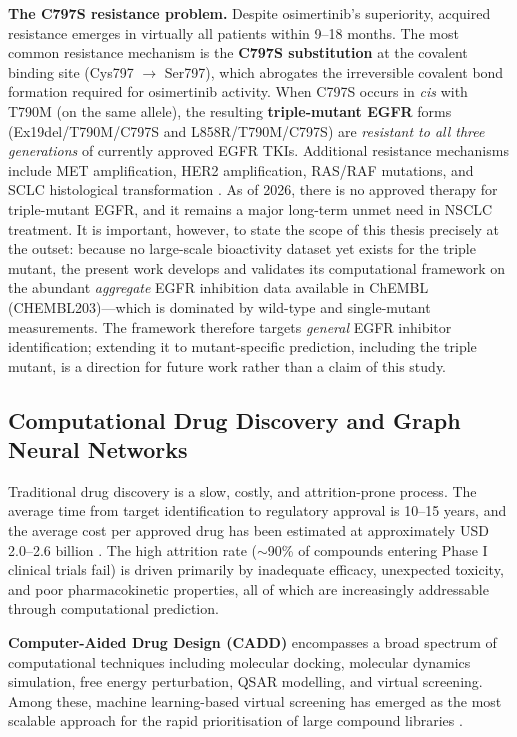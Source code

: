 \textbf{The C797S resistance problem.} Despite osimertinib's superiority, acquired
resistance emerges in virtually all patients within 9--18 months. The most common
resistance mechanism is the \textbf{C797S substitution} at the covalent binding
site (Cys797 $\to$ Ser797), which abrogates the irreversible covalent bond
formation required for osimertinib activity. When C797S occurs in \textit{cis}
with T790M (on the same allele), the resulting \textbf{triple-mutant EGFR} forms
(Ex19del/T790M/C797S and L858R/T790M/C797S) are \textit{resistant to all three
generations} of currently approved EGFR TKIs. Additional resistance mechanisms
include MET amplification, HER2 amplification, RAS/RAF mutations, and SCLC
histological transformation \parencite{leonetti2019resistance}. As of 2026, there
is no approved therapy for triple-mutant EGFR, and it remains a major long-term unmet
need in NSCLC treatment. It is important, however, to state the scope of this thesis
precisely at the outset: because no large-scale bioactivity dataset yet exists for the
triple mutant, the present work develops and validates its computational framework on
the abundant \emph{aggregate} EGFR inhibition data available in ChEMBL
(CHEMBL203)---which is dominated by wild-type and single-mutant measurements. The
framework therefore targets \emph{general} EGFR inhibitor identification; extending it
to mutant-specific prediction, including the triple mutant, is a direction for future
work rather than a claim of this study.

\subsection{Computational Drug Discovery and Graph Neural Networks}

Traditional drug discovery is a slow, costly, and attrition-prone process.
The average time from target identification to regulatory approval is 10--15 years,
and the average cost per approved drug has been estimated at approximately USD
2.0--2.6 billion \parencite{schneider2020rethinking}. The high attrition rate
($\sim$90\% of compounds entering Phase I clinical trials fail) is driven primarily
by inadequate efficacy, unexpected toxicity, and poor pharmacokinetic properties,
all of which are increasingly addressable through computational prediction.

\textbf{Computer-Aided Drug Design (CADD)} encompasses a broad spectrum of
computational techniques including molecular docking, molecular dynamics simulation,
free energy perturbation, QSAR modelling, and virtual screening. Among these,
machine learning-based virtual screening has emerged as the most scalable approach
for the rapid prioritisation of large compound libraries \parencite{walters2020generative}.

